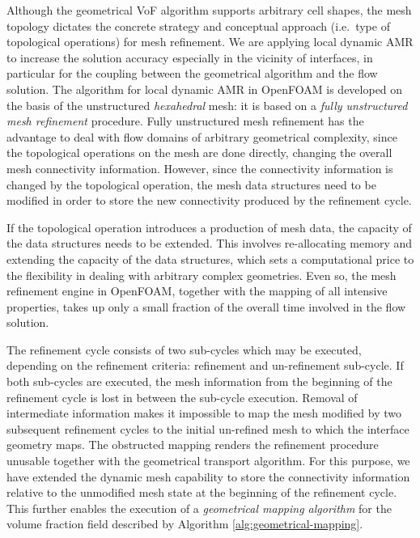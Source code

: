 Although the geometrical VoF algorithm supports arbitrary cell shapes, the mesh
topology dictates the concrete strategy and conceptual approach (i.e.\ type of
topological operations) for mesh refinement. We are applying local dynamic AMR
to increase the solution accuracy especially in the vicinity of interfaces, in
particular for the coupling between the geometrical algorithm and the flow
solution. The algorithm for local dynamic AMR in OpenFOAM is developed on the
basis of the unstructured \emph{hexahedral} mesh: it is based on a \emph{fully
unstructured mesh refinement} procedure. Fully unstructured mesh refinement has
the advantage to deal with flow domains of arbitrary geometrical complexity,
since the topological operations on the mesh are done directly, changing the
overall mesh connectivity information. However, since the connectivity
information is changed by the topological operation, the mesh data structures
need to be modified in order to store the new connectivity produced by the
refinement cycle.  

If the topological operation introduces a production of mesh data, the capacity
of the data structures needs to be extended. This involves re-allocating memory
and extending the capacity of the data structures, which sets a computational
price to the flexibility in dealing with arbitrary complex geometries. Even so,
the mesh refinement engine in OpenFOAM, together with the mapping of all
intensive properties, takes up only a small fraction of the overall time
involved in the flow solution.

The refinement cycle consists of two sub-cycles which may be executed,
depending on the refinement criteria: refinement and un-refinement sub-cycle.
If both sub-cycles are executed, the mesh information from the beginning of the
refinement cycle is lost in between the sub-cycle execution. Removal of
intermediate information makes it impossible to map the mesh modified by two
subsequent refinement cycles to the initial un-refined mesh to which the
interface geometry maps. The obstructed mapping renders the refinement
procedure unusable together with the geometrical transport algorithm. For this
purpose, we have extended the dynamic mesh capability to store the connectivity
information relative to the unmodified mesh state at the beginning of the
refinement cycle. This further enables the execution of a \emph{geometrical
mapping algorithm} for the volume fraction field described by Algorithm
\ref{alg:geometrical-mapping}. 

